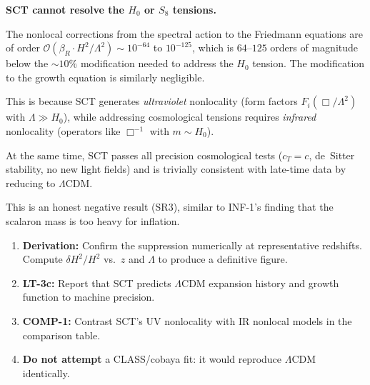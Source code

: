 \documentclass[11pt,a4paper]{article}
\theoremstyle{plain}
\theoremstyle{definition}
\theoremstyle{remark}
\begin{document}
\begin{tcolorbox}[colback=orange!5!white, colframe=orange!50!black,
  title={\textbf{MT-2 Literature Review: Central Finding}}]
\textbf{SCT cannot resolve the $H_0$ or $S_8$ tensions.}

The nonlocal corrections from the spectral action to the Friedmann
equations are of order
$\mathcal{O}(\beta_R \cdot H^2/\Lambda^2) \sim 10^{-64}$ to
$10^{-125}$, which is $64$--$125$ orders of magnitude below the
$\sim 10\%$ modification needed to address the $H_0$ tension. The
modification to the growth equation is similarly negligible.

This is because SCT generates \emph{ultraviolet} nonlocality (form
factors $F_i(\Box/\Lambda^2)$ with $\Lambda \gg H_0$), while
addressing cosmological tensions requires \emph{infrared} nonlocality
(operators like $\Box^{-1}$ with $m \sim H_0$).

At the same time, SCT passes all precision cosmological tests
($c_T = c$, de~Sitter stability, no new light fields) and is trivially
consistent with late-time data by reducing to $\Lambda$CDM.

This is an honest negative result (SR3), similar to INF-1's finding
that the scalaron mass is too heavy for inflation.
\end{tcolorbox}

\begin{tcolorbox}[colback=blue!5!white, colframe=blue!50!black,
  title={\textbf{Recommendation for Downstream Tasks}}]
\begin{enumerate}[nosep]
  \item \textbf{Derivation:} Confirm the suppression numerically at
    representative redshifts. Compute $\delta H^2/H^2$ vs.\ $z$ and
    $\Lambda$ to produce a definitive figure.
  \item \textbf{LT-3c:} Report that SCT predicts $\Lambda$CDM
    expansion history and growth function to machine precision.
  \item \textbf{COMP-1:} Contrast SCT's UV nonlocality with IR
    nonlocal models in the comparison table.
  \item \textbf{Do not attempt} a CLASS/cobaya fit: it would
    reproduce $\Lambda$CDM identically.
\end{enumerate}
\end{tcolorbox}
\end{document}
